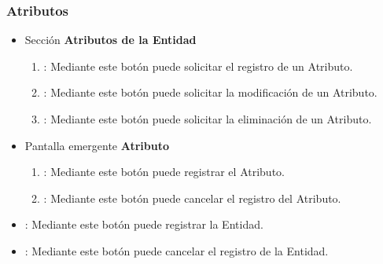 \subsubsection{Atributos}
\begin{itemize}
  \item Sección \textbf{Atributos de la Entidad}
  \begin{enumerate}
	\item {}: Mediante este botón puede solicitar el registro de un Atributo.
	\item {}: Mediante este botón puede solicitar la modificación de un Atributo.
	\item {}: Mediante este botón puede solicitar la eliminación de un Atributo.
  \end{enumerate}
  \item Pantalla emergente \textbf{Atributo}
  \begin{enumerate}
	\item {}: Mediante este botón puede registrar el Atributo.
	\item {}: Mediante este botón puede cancelar el registro del Atributo.
  \end{enumerate}
 \item {}: Mediante este botón puede registrar la Entidad.
 \item {}: Mediante este botón puede cancelar el registro de la Entidad.
\end{itemize}
	
	
